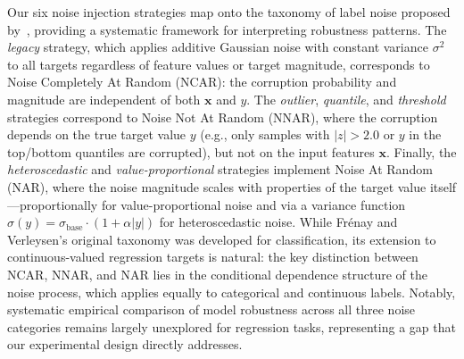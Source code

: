 Our six noise injection strategies map onto the taxonomy of label noise proposed
by~\citet{frenay2014classification}, providing a systematic framework for
interpreting robustness patterns. The \textit{legacy} strategy, which applies
additive Gaussian noise with constant variance $\sigma^2$ to all targets
regardless of feature values or target magnitude, corresponds to Noise
Completely At Random (NCAR): the corruption probability and magnitude are
independent of both $\mathbf{x}$ and $y$. The \textit{outlier},
\textit{quantile}, and \textit{threshold} strategies correspond to Noise Not At
Random (NNAR), where the corruption depends on the true target value $y$
(e.g., only samples with $|z| > 2.0$ or $y$ in the top/bottom quantiles are
corrupted), but not on the input features $\mathbf{x}$. Finally, the
\textit{heteroscedastic} and \textit{value-proportional} strategies implement
Noise At Random (NAR), where the noise magnitude scales with properties of the
target value itself---proportionally for value-proportional noise and via a
variance function $\sigma(y) = \sigma_{\text{base}} \cdot (1 + \alpha|y|)$ for
heteroscedastic noise. While Fr{\'e}nay and Verleysen's original taxonomy was
developed for classification, its extension to continuous-valued regression
targets is natural: the key distinction between NCAR, NNAR, and NAR lies in
the conditional dependence structure of the noise process, which applies
equally to categorical and continuous labels. Notably, systematic empirical
comparison of model robustness across all three noise categories remains
largely unexplored for regression tasks, representing a gap that our
experimental design directly addresses.



